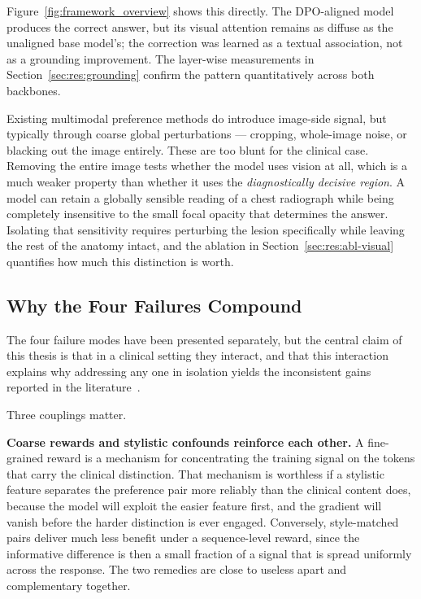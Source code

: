 Figure~\ref{fig:framework_overview} shows this directly. The DPO-aligned model produces the correct answer, but its visual attention remains as diffuse as the unaligned base model's; the correction was learned as a textual association, not as a grounding improvement. The layer-wise measurements in Section~\ref{sec:res:grounding} confirm the pattern quantitatively across both backbones.

Existing multimodal preference methods do introduce image-side signal, but typically through coarse global perturbations --- cropping, whole-image noise, or blacking out the image entirely. These are too blunt for the clinical case. Removing the entire image tests whether the model uses vision at all, which is a much weaker property than whether it uses the \emph{diagnostically decisive region}. A model can retain a globally sensible reading of a chest radiograph while being completely insensitive to the small focal opacity that determines the answer. Isolating that sensitivity requires perturbing the lesion specifically while leaving the rest of the anatomy intact, and the ablation in Section~\ref{sec:res:abl-visual} quantifies how much this distinction is worth.

\subsection{Why the Four Failures Compound}
\label{sec:ana:compound}

The four failure modes have been presented separately, but the central claim of this thesis is that in a clinical setting they interact, and that this interaction explains why addressing any one in isolation yields the inconsistent gains reported in the literature~\cite{kim2026benchmarking}.

Three couplings matter.

\textbf{Coarse rewards and stylistic confounds reinforce each other.} A fine-grained reward is a mechanism for concentrating the training signal on the tokens that carry the clinical distinction. That mechanism is worthless if a stylistic feature separates the preference pair more reliably than the clinical content does, because the model will exploit the easier feature first, and the gradient will vanish before the harder distinction is ever engaged. Conversely, style-matched pairs deliver much less benefit under a sequence-level reward, since the informative difference is then a small fraction of a signal that is spread uniformly across the response. The two remedies are close to useless apart and complementary together.

